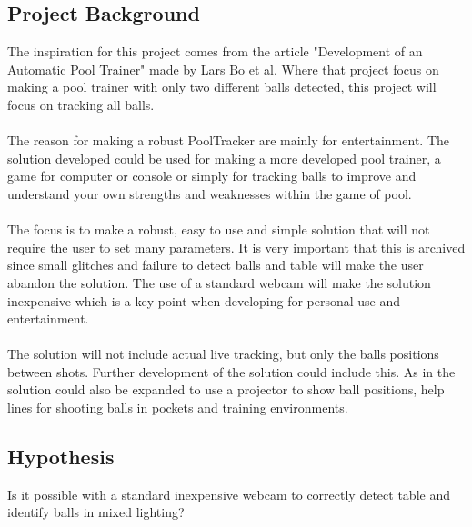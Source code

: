 \subsection{Project Background}
The inspiration for this project comes from the article "Development of an Automatic Pool Trainer"\cite{larsbopool} made by Lars Bo et al. Where that project focus on making a pool trainer with only two different balls detected, this project will focus on tracking all balls. 
\\\\
The reason for making a robust PoolTracker are mainly for entertainment. The solution developed could be used for making a more developed pool trainer, a game for computer or console or simply for tracking balls to improve and understand your own strengths and weaknesses within the game of pool.
\\\\
The focus is to make a robust, easy to use and simple solution that will not require the user to set many parameters. It is very important that this is archived since small glitches and failure to detect balls and table will make the user abandon the solution. The use of a standard webcam will make the solution inexpensive which is a key point when developing for personal use and entertainment.
\\\\
The solution will not include actual live tracking, but only the balls positions between shots. Further development of the solution could include this. As in \cite{larsbopool} the solution could also be expanded to use a projector to show ball positions, help lines for shooting balls in pockets and training environments. 

\subsection{Hypothesis}
Is it possible with a standard inexpensive webcam to correctly detect table and identify balls in mixed lighting?
